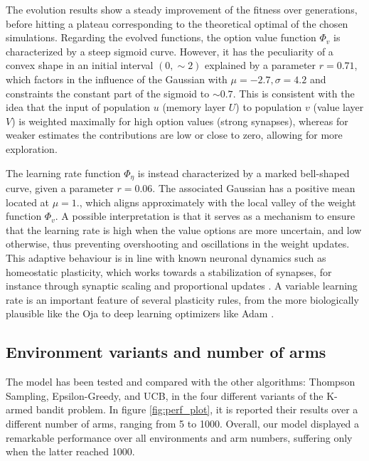 \noindent The evolution results show a steady improvement of the fitness over generations, before hitting a plateau corresponding to the theoretical optimal of the chosen simulations.
Regarding the evolved functions, the option value function $\Phi_{v}$ is characterized by a steep sigmoid curve.
However, it has the peculiarity of a convex shape in an initial interval $(0, \sim 2)$ explained by a parameter $r=0.71$, which factors in the influence of the Gaussian with $\mu=-2.7, \sigma=4.2$ and constraints the constant part of the sigmoid to $\sim 0.7$.
This is consistent with the idea that the input of population $u$ (memory layer $U$) to population $v$ (value layer $V$) is weighted maximally for high option values (strong synapses), whereas for weaker estimates the contributions are low or close to zero, allowing for more exploration.

The learning rate function $\Phi_{\eta}$ is instead characterized by a marked bell-shaped curve, given a parameter $r=0.06$. The associated Gaussian has a positive mean located at $\mu=1.$, which aligns approximately with the local valley of the weight function $\Phi_{v}$.
A possible interpretation is that it serves as a mechanism to ensure that the learning rate is high when the value options are more uncertain, and low otherwise, thus preventing overshooting and oscillations in the weight updates.
This adaptive behaviour is in line with known neuronal dynamics such as homeostatic plasticity, which works towards a stabilization of synapses, for instance through synaptic scaling and proportional updates \cite{citriSynapticPlasticityMultiple2008}.
A variable learning rate is an important feature of several plasticity rules, from the more biologically plausible like the Oja \cite{ojaOjaLearningRule2008} to deep learning optimizers like Adam \cite{kingmaAdamMethodStochastic2017}.


\subsection{Environment variants and number of arms}

The model has been tested and compared with the other algorithms: Thompson Sampling, Epsilon-Greedy, and UCB, in the four different variants of the K-armed bandit problem.
In figure \ref{fig:perf_plot}, it is reported their results over a different number of arms, ranging from 5 to 1000.
Overall, our model displayed a remarkable performance over all environments and arm numbers, suffering only when the latter reached 1000.

